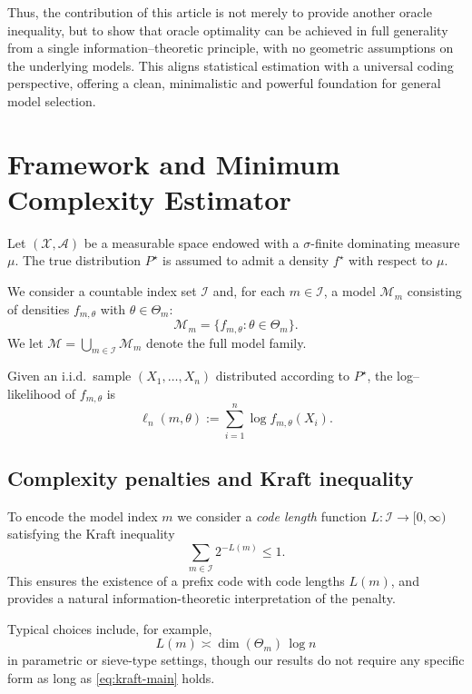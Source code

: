 \documentclass[12pt]{article}
\numberwithin{equation}{section}
\begin{document}
Thus, the contribution of this article is not merely to provide another
oracle inequality, but to show that oracle optimality can be achieved
in full generality from a single information–theoretic principle, with
no geometric assumptions on the underlying models.
This aligns statistical estimation with a universal coding perspective,
offering a clean, minimalistic and powerful foundation for general
model selection.

	
	\section{Framework and Minimum Complexity Estimator}
	\label{sec:framework}
	
	Let $(\mathcal{X},\mathcal{A})$ be a measurable space endowed with a
	$\sigma$-finite dominating measure $\mu$. The true distribution
	$P^{\star}$ is assumed to admit a density $f^{\star}$ with respect to
	$\mu$.
	
	We consider a countable index set $\mathcal{I}$ and, for each
	$m\in\mathcal{I}$, a model $\mathcal{M}_m$ consisting of densities
	$f_{m,\theta}$ with $\theta\in\Theta_m$:
	\[
	\mathcal{M}_m = \{f_{m,\theta}: \theta\in\Theta_m\}.
	\]
	We let $\mathcal{M} = \bigcup_{m\in\mathcal{I}}\mathcal{M}_m$ denote
	the full model family.
	
	Given an i.i.d.\ sample $(X_1,\ldots,X_n)$ distributed according to
	$P^{\star}$, the log--likelihood of $f_{m,\theta}$ is
	\[
	\ell_n(m,\theta)
	:= \sum_{i=1}^n \log f_{m,\theta}(X_i).
	\]
	
	\subsection{Complexity penalties and Kraft inequality}
	
	To encode the model index $m$ we consider a \emph{code length} function
	$L:\mathcal{I}\to[0,\infty)$ satisfying the Kraft inequality
	\begin{equation}
		\label{eq:kraft-main}
		\sum_{m\in\mathcal{I}} 2^{-L(m)} \le 1.
	\end{equation}
	This ensures the existence of a prefix code with code lengths $L(m)$,
	and provides a natural information-theoretic interpretation of the
	penalty.
	
	Typical choices include, for example,
	\[
	L(m) \asymp \dim(\Theta_m)\,\log n
	\]
	in parametric or sieve-type settings, though our results do not require
	any specific form as long as \eqref{eq:kraft-main} holds.
	
\end{document}
